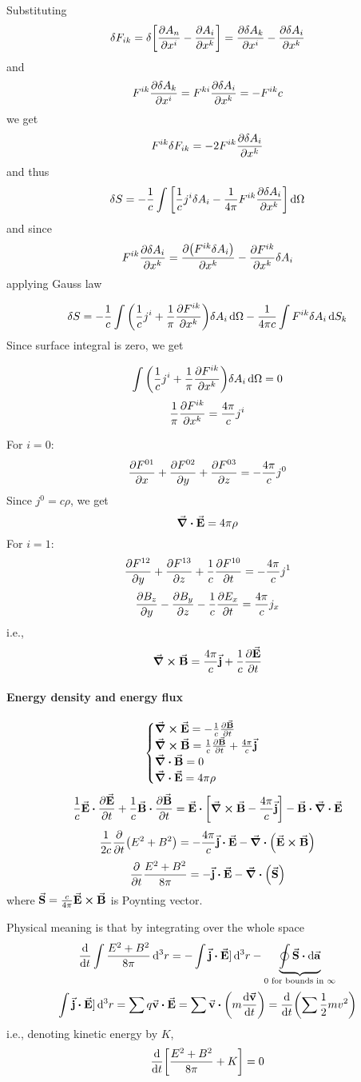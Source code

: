 Substituting
$$\delta F_{ik} = \delta \qty[\pdv{A_n}{x^i} - \pdv{A_i}{x^k}] = \pdv{\delta A_k}{x^i}-\pdv{\delta A_i}{x^k}$$
and
$$F^{ik} \pdv{\delta A_k}{x^i} =F^{ki}  \pdv{\delta A_i}{x^k} = - F^{ik} c $$
we get
$$F^{ik} \delta F_{ik} = -2 F^{ik}\pdv{\delta A_i}{x^k}  $$
and thus
$$\delta S = -\frac{1}{c} \int \qty[\frac{1}{c} j^i \delta A_i - \frac{1}{4\pi} F^{ik}\pdv{\delta A_i}{x^k} ] \dd{\Omega}$$
and since
$$F^{ik}\pdv{\delta A_i}{x^k} = \pdv{\qty(F^{ik}\delta A_i)}{x^k} - \pdv{F^{ik}}{x^k} \delta A_i$$
applying Gauss law

$$\delta S = -\frac{1}{c} \int \qty(\frac{1}{c} j^i  + \frac{1}{\pi}\pdv{F^{ik}}{x^k})\delta A_i \dd{\Omega}- \frac{1}{4\pi c} \int F^{ik} \delta A_i \dd{S_k}$$
Since surface integral is zero, we get

$$\int \qty(\frac{1}{c} j^i  + \frac{1}{\pi}\pdv{F^{ik}}{x^k})\delta A_i \dd{\Omega} = 0$$
$$ \frac{1}{\pi}\pdv{F^{ik}}{x^k} = \frac{4\pi}{c} j^i  $$


For $i=0$:
$$\pdv{F^{01}}{x}+\pdv{F^{02}}{y}+\pdv{F^{03}}{z} = -\frac{4\pi }{c} j^0$$
Since $j^0 = c\rho$, we get
$$\div{\va{E}} = 4\pi \rho$$
For $i=1$:
$$\pdv{F^{12}}{y}+\pdv{F^{13}}{z}+\frac{1}{c}\pdv{F^{10}}{t} = -\frac{4\pi }{c} j^1$$
$$\pdv{B_z}{y} - \pdv{B_y}{z} - \frac{1}{c} \pdv{E_x}{t} = \frac{4\pi}{c} j_x$$
i.e.,
$$\curl{\va{B}} = \frac{4\pi}{c} \va{j} + \frac{1}{c} \pdv{\va{E}}{t}$$
\paragraph{Energy density and energy flux}
$$\begin{cases}
\curl{\va{E}} = - \frac{1}{c} \pdv{\va{B}}{t}\\
\curl{\va{B}} =  \frac{1}{c} \pdv{\va{B}}{t} + \frac{4\pi}{c} \va{j}\\
\div{\va{B}}=0\\
\div{\va{E}} = 4\pi \rho
\end{cases}$$
$$\frac{1}{c} \va{E} \vdot \pdv{\va{E}}{t} + \frac{1}{c} \va{B}\vdot \pdv{\va{B}}{t} = \va{E} \vdot \qty[\curl{\va{B}} - \frac{4\pi}{c} \va{j}] - \va{B} \vdot \div{\va{E}} $$
$$\frac{1}{2c} \pdv{t} \qty( E^2+B^2) = - \frac{4\pi}{c} \va{j} \vdot \va{E}  - \div(\va{E} \cross \va{B})$$
$$ \pdv{t} \frac{E^2+B^2}{8\pi} = - \va{j} \vdot \va{E}  - \div(\va{S})$$
where $\va{S} = \frac{c}{4\pi} \va{E} \cross \va{B}$ is Poynting vector.

Physical meaning is that by integrating over the whole space
$$\dv{t} \int \frac{E^2+B^2}{8\pi} \dd[3]{r}= - \int \va{j} \vdot \va{E}] \dd[3]{r} - \underbrace{\oint \va{S} \vdot \dd{\va{a}}}_{0 \text{ for bounds in } \infty}$$
$$ \int \va{j} \vdot \va{E}] \dd[3]{r} = \sum q \va{v} \vdot \va{E} = \sum \va{v} \vdot \qty(m \dv{\va{v}}{t}) = \dv{t} (\sum \frac{1}{2} m v^2)$$
i.e., denoting kinetic energy by $K$,
$$\dv{t} \qty[\frac{E^2+B^2}{8\pi}  + K] = 0$$